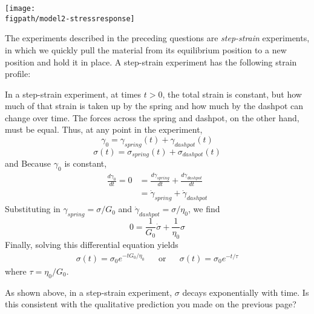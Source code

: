\begin{activity}
\begin{ctqs}
\begin{enumerate}
					\centerline{\texttt{[image: \\figpath/model2-stressresponse]}}
			\end{enumerate}
			
\end{ctqs}
	
\vspace{-0.25in}
\begin{infobox}

	The experiments described in the preceding questions are \emph{step-strain} experiments, in which we quickly pull the material from its equilibrium position to a new position and hold it in place.  A step-strain experiment has the following strain profile:
	
	In a step-strain experiment, at times $t>0$, the total strain is constant, but how much of that strain is taken up by the spring and how much by the dashpot can change over time.
	The forces across the spring and dashpot, on the other hand, must be equal.
	Thus, at any point in the experiment,
	\begin{equation*}
		\gamma_0 = \gamma_{spring}(t) + \gamma_{dashpot}(t)
	\end{equation*}
	\begin{equation*}
		\sigma(t) = \sigma_{spring}(t) + \sigma_{dashpot}(t)
	\end{equation*}
	and 
	Because $\gamma_0$ is constant,
	\begin{align*}
		\frac{d\gamma_0}{dt} = 0 &= \frac{d\gamma_{spring}}{dt} + \frac{d\gamma_{dashpot}}{dt}\\
		&= \dot\gamma_{spring} + \dot\gamma_{dashpot}
	\end{align*}
	Substituting in $\gamma_{spring} = \sigma/G_0$ and $\dot \gamma_{dashpot} = \sigma/\eta_0$, we find
	\begin{equation*}
		0 = \frac{1}{G_0}\dot\sigma + \frac{1}{\eta_0}\sigma
	\end{equation*}
	Finally, solving this differential equation yields
	\begin{align*}
		\sigma(t) = \sigma_0 e^{-t G_0/\eta_0}  && \text{or} && \sigma(t) = \sigma_0 e^{-t /\tau}
	\end{align*}
	where $\tau = \eta_0/G_0$.

\end{infobox}
	
\begin{ctqs}
		\question As shown above, in a step-strain experiment, $\sigma$ decays exponentially with time.  Is this consistent with the qualitative prediction you made on the previous page?
	

\end{ctqs}
\end{activity}
